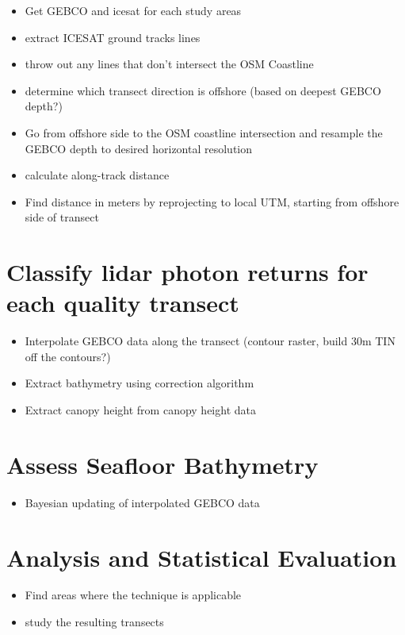 \begin{itemize}
      \item Get GEBCO and icesat for each study areas
      \item extract ICESAT ground tracks lines
      \item throw out any lines that don't intersect the OSM Coastline
      \item determine which transect direction is offshore (based on deepest GEBCO depth?)
      \item Go from offshore side to the OSM coastline intersection and resample the GEBCO depth to desired horizontal resolution
      \item calculate along-track distance
      \item Find distance in meters by reprojecting to local UTM, starting from offshore side of transect
\end{itemize}

\section{Classify lidar photon returns for each quality  transect}

\begin{itemize}
      \item Interpolate GEBCO data along the transect (contour raster, build 30m TIN off the contours?)
      \item Extract bathymetry using correction algorithm
      \item Extract canopy height from canopy height data
\end{itemize}


\section{Assess Seafloor Bathymetry}

\begin{itemize}
      \item Bayesian updating of interpolated GEBCO data
\end{itemize}

\section{Analysis and Statistical Evaluation}

\begin{itemize}
      \item Find areas where the technique is applicable
      \item study the resulting transects
\end{itemize}

